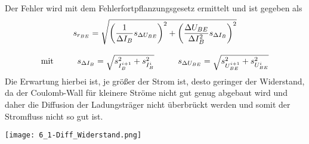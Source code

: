 Der Fehler wird mit dem Fehlerfortpflanzungsgesetz ermittelt und ist gegeben als
\begin{gather}
    s_{r_{BE}}=\sqrt{\left(\frac{1}{\Delta I_B}s_{\Delta U_{BE}}\right)^2+\left(\frac{\Delta U_{BE}}{\Delta I_B^2}s_{\Delta I_B}\right)^2}\\[0.3cm]
    \text{mit}\hspace*{1cm} s_{\Delta I_B}=\sqrt{s_{I^{i+1}_B}^2+s_{I^{i}_B}^2}\hspace*{1cm} s_{\Delta U_{BE}}=\sqrt{s_{U^{i+1}_{BE}}^2+s_{U^{i}_{BE}}^2}
\end{gather}
Die Erwartung hierbei ist, je größer der Strom ist, desto geringer der Widerstand, da der Coulomb-Wall für kleinere Ströme nicht gut genug abgebaut wird und daher die Diffusion der Ladungsträger nicht überbrückt werden und somit der Stromfluss nicht so gut ist.
\newpage
\begin{center}
    \texttt{[image: 6\_1-Diff\_Widerstand.png]}
\end{center}
\newpage
